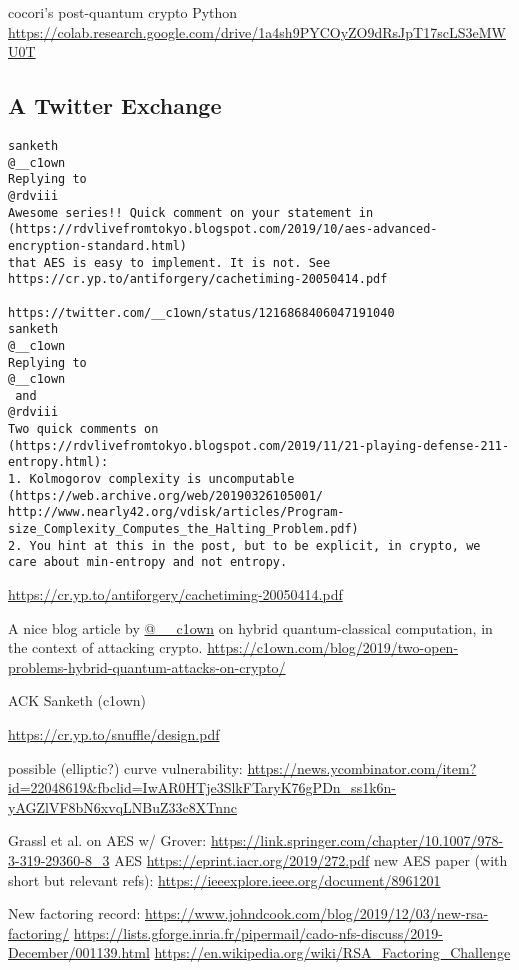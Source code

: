 \documentclass[%
 aip,
 jmp,%
 amsmath,amssymb,
 reprint,%
]{revtex4-1}
\begin{document}
cocori's post-quantum crypto Python
\url{https://colab.research.google.com/drive/1a4sh9PYCOyZO9dRsJpT17scLS3eMWU0T}

\subsection{A Twitter Exchange}

\begin{verbatim}
sanketh
@__c1own
Replying to 
@rdviii
Awesome series!! Quick comment on your statement in
(https://rdvlivefromtokyo.blogspot.com/2019/10/aes-advanced-encryption-standard.html)
that AES is easy to implement. It is not. See
https://cr.yp.to/antiforgery/cachetiming-20050414.pdf

https://twitter.com/__c1own/status/1216868406047191040
sanketh
@__c1own
Replying to 
@__c1own
 and 
@rdviii
Two quick comments on (https://rdvlivefromtokyo.blogspot.com/2019/11/21-playing-defense-211-entropy.html):
1. Kolmogorov complexity is uncomputable (https://web.archive.org/web/20190326105001/ http://www.nearly42.org/vdisk/articles/Program-size_Complexity_Computes_the_Halting_Problem.pdf)
2. You hint at this in the post, but to be explicit, in crypto, we
care about min-entropy and not entropy.
\end{verbatim}

\url{https://cr.yp.to/antiforgery/cachetiming-20050414.pdf}

A nice blog article by \url{@__c1own} on hybrid quantum-classical computation, in the context of attacking crypto.
\url{https://c1own.com/blog/2019/two-open-problems-hybrid-quantum-attacks-on-crypto/}

ACK Sanketh (c1own)

\url{https://cr.yp.to/snuffle/design.pdf}

possible (elliptic?) curve vulnerability:
\url{https://news.ycombinator.com/item?id=22048619&fbclid=IwAR0HTje3SlkFTaryK76gPDn_ss1k6n-yAGZlVF8bN6xvqLNBuZ33c8XTnnc}

Grassl et al. on AES w/ Grover:
\url{https://link.springer.com/chapter/10.1007/978-3-319-29360-8_3}
AES
\url{https://eprint.iacr.org/2019/272.pdf}
new AES paper (with short but relevant refs):
\url{https://ieeexplore.ieee.org/document/8961201}

New factoring record:
\url{https://www.johndcook.com/blog/2019/12/03/new-rsa-factoring/}
\url{https://lists.gforge.inria.fr/pipermail/cado-nfs-discuss/2019-December/001139.html}
\url{https://en.wikipedia.org/wiki/RSA_Factoring_Challenge}
\end{document}
